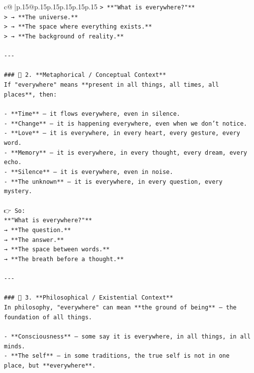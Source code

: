 \documentclass{article}
\begin{document}
{\begin{supertabular}{c@{$\;$}|p{.15\linewidth}@{}p{.15\linewidth}p{.15\linewidth}p{.15\linewidth}p{.15\linewidth}p{.15\linewidth}}
{{{\texttt{> **"What is everywhere?"**  } \\
\texttt{> → **The universe.**  } \\
\texttt{> → **The space where everything exists.**  } \\
\texttt{> → **The background of reality.**} \\
\\ 
\texttt{{-}{-}{-}} \\
\\ 
\texttt{\#\#\# 🔹 2. **Metaphorical / Conceptual Context**  } \\
\texttt{If "everywhere" means **present in all things, all times, all places**, then:} \\
\\ 
\texttt{{-} **Time** — it flows everywhere, even in silence.  } \\
\texttt{{-} **Change** — it is happening everywhere, even when we don’t notice.  } \\
\texttt{{-} **Love** — it is everywhere, in every heart, every gesture, every word.  } \\
\texttt{{-} **Memory** — it is everywhere, in every thought, every dream, every echo.  } \\
\texttt{{-} **Silence** — it is everywhere, even in noise.  } \\
\texttt{{-} **The unknown** — it is everywhere, in every question, every mystery.} \\
\\ 
\texttt{👉 So:  } \\
\texttt{**"What is everywhere?"**  } \\
\texttt{→ **The question.**  } \\
\texttt{→ **The answer.**  } \\
\texttt{→ **The space between words.**  } \\
\texttt{→ **The breath before a thought.**} \\
\\ 
\texttt{{-}{-}{-}} \\
\\ 
\texttt{\#\#\# 🔹 3. **Philosophical / Existential Context**  } \\
\texttt{In philosophy, "everywhere" can mean **the ground of being** — the foundation of all things.} \\
\\ 
\texttt{{-} **Consciousness** — some say it is everywhere, in all things, in all minds.  } \\
\texttt{{-} **The self** — in some traditions, the true self is not in one place, but **everywhere**.  } \\
}}}
\end{supertabular}}
\end{document}
